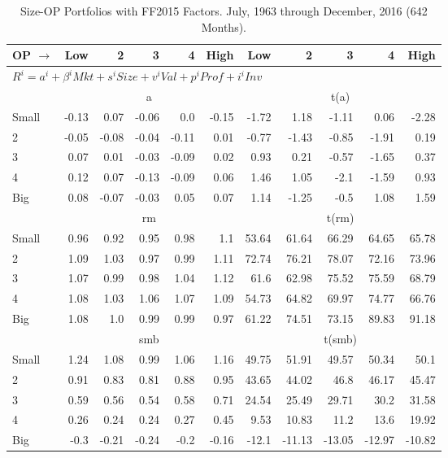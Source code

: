 
\begin{table}[!ht]
\centering
\caption{Size-OP Portfolios with FF2015 Factors. \footnotesize{July, 1963 through December, 2016 (642 Months).}}
\begin{tabular}{lrrrrrrrrrr}
  \toprule
  OP $\rightarrow$ & Low & 2 & 3 & 4 & High & Low & 2 & 3 & 4 & High \\ 
  \toprule
  \multicolumn{9}{l}{$R^i=a^i+\beta^iMkt+s^iSize+v^iVal+p^iProf+i^iInv$} \\

  

      & \multicolumn{5}{c}{a} & \multicolumn{5}{c}{t(a)} \\
    \cmidrule(r){2-6} \cmidrule(r){7-11}
      Small  & -0.13  & 0.07  & -0.06  & 0.0  & -0.15   & -1.72  & 1.18  & -1.11  & 0.06  & -2.28  \\
          2  & -0.05  & -0.08  & -0.04  & -0.11  & 0.01   & -0.77  & -1.43  & -0.85  & -1.91  & 0.19  \\
          3  & 0.07  & 0.01  & -0.03  & -0.09  & 0.02   & 0.93  & 0.21  & -0.57  & -1.65  & 0.37  \\
          4  & 0.12  & 0.07  & -0.13  & -0.09  & 0.06   & 1.46  & 1.05  & -2.1  & -1.59  & 0.93  \\
      Big    & 0.08  & -0.07  & -0.03  & 0.05  & 0.07   & 1.14  & -1.25  & -0.5  & 1.08  & 1.59  \\

  

      & \multicolumn{5}{c}{rm} & \multicolumn{5}{c}{t(rm)} \\
    \cmidrule(r){2-6} \cmidrule(r){7-11}
      Small  & 0.96  & 0.92  & 0.95  & 0.98  & 1.1   & 53.64  & 61.64  & 66.29  & 64.65  & 65.78  \\
          2  & 1.09  & 1.03  & 0.97  & 0.99  & 1.11   & 72.74  & 76.21  & 78.07  & 72.16  & 73.96  \\
          3  & 1.07  & 0.99  & 0.98  & 1.04  & 1.12   & 61.6  & 62.98  & 75.52  & 75.59  & 68.79  \\
          4  & 1.08  & 1.03  & 1.06  & 1.07  & 1.09   & 54.73  & 64.82  & 69.97  & 74.77  & 66.76  \\
      Big    & 1.08  & 1.0  & 0.99  & 0.99  & 0.97   & 61.22  & 74.51  & 73.15  & 89.83  & 91.18  \\

  

      & \multicolumn{5}{c}{smb} & \multicolumn{5}{c}{t(smb)} \\
    \cmidrule(r){2-6} \cmidrule(r){7-11}
      Small  & 1.24  & 1.08  & 0.99  & 1.06  & 1.16   & 49.75  & 51.91  & 49.57  & 50.34  & 50.1  \\
          2  & 0.91  & 0.83  & 0.81  & 0.88  & 0.95   & 43.65  & 44.02  & 46.8  & 46.17  & 45.47  \\
          3  & 0.59  & 0.56  & 0.54  & 0.58  & 0.71   & 24.54  & 25.49  & 29.71  & 30.2  & 31.58  \\
          4  & 0.26  & 0.24  & 0.24  & 0.27  & 0.45   & 9.53  & 10.83  & 11.2  & 13.6  & 19.92  \\
      Big    & -0.3  & -0.21  & -0.24  & -0.2  & -0.16   & -12.1  & -11.13  & -13.05  & -12.97  & -10.82  \\


\end{tabular}
\end{table}
